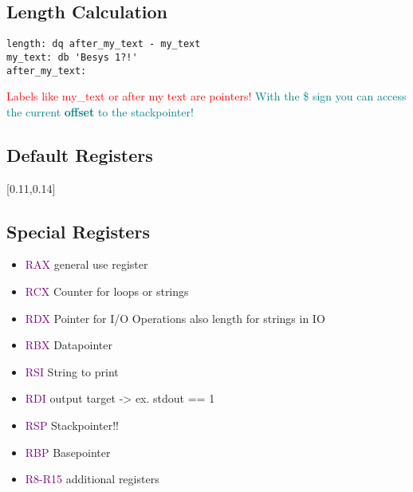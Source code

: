 \documentclass[main.tex,fontsize=8pt,paper=a4,paper=landscape,DIV=calc,]{scrartcl}
\begin{document}
\begin{multicols*}{4}
\subsection{Length Calculation}
\vspace{-2.5mm}
\begin{lstlisting}
length: dq after_my_text - my_text
my_text: db 'Besys 1?!'
after_my_text:
\end{lstlisting}
\vspace{2mm}
\textcolor{red}{Labels like my\_text or after my text are pointers!}\newline
\textcolor{teal}{With the \$ sign you can access the current \textbf{offset} to the stackpointer!}

\subsection{Default Registers}
[0.11,0.14]

\subsection{Special Registers}
\begin{itemize}
  \item \textcolor{purple}{RAX} general use register
  \item \textcolor{purple}{RCX} Counter for loops or strings
  \item \textcolor{purple}{RDX} Pointer for I/O Operations\newline
    also length for strings in IO
  \item \textcolor{purple}{RBX} Datapointer
  \item \textcolor{purple}{RSI} String to print
  \item \textcolor{purple}{RDI} output target -> ex. stdout == 1
  \item \textcolor{purple}{RSP} Stackpointer!!
  \item \textcolor{purple}{RBP} Basepointer
  \item \textcolor{purple}{R8-R15} additional registers
\end{itemize}


\end{multicols*}
\end{document}
